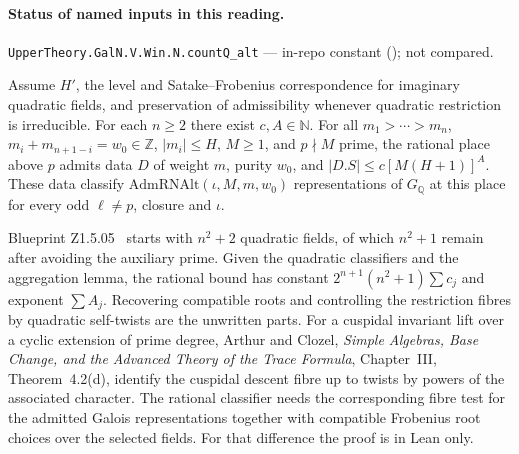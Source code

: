 

\paragraph{Status of named inputs in this reading.}
\noindent\nolinkurl{UpperTheory.GalN.V.Win.N.countQ_alt} --- in-repo constant (); not compared.\par

\begin{formalstatement}\label{pn:P030}
Assume \(H'\), the level and Satake--Frobenius correspondence for
imaginary quadratic fields, and preservation of admissibility whenever
quadratic restriction is irreducible. For each \(n\ge2\) there exist
\(c,A\in\mathbb N\). For all \(m_1>\cdots>m_n\),
\(m_i+m_{n+1-i}=w_0\in\mathbb Z\), \(|m_i|\le H\), \(M\ge1\),
and \(p\nmid M\) prime, the rational place above \(p\) admits data
\(D\) of weight \(m\), purity \(w_0\), and \(|D.S|\le c[M(H+1)]^A\).
These data classify \(\mathrm{AdmRNAlt}(\iota,M,m,w_0)\) representations
of \(G_{\mathbb Q}\) at this place for every odd \(\ell\ne p\), closure
and \(\iota\).
\end{formalstatement}

Blueprint Z1.5.05~ starts with \(n^2+2\) quadratic fields, of which
\(n^2+1\) remain after avoiding the auxiliary prime. Given the
quadratic classifiers and the aggregation lemma, the rational bound
has constant \(2^{n+1}(n^2+1)\sum c_j\) and exponent \(\sum A_j\).
Recovering compatible roots and controlling the restriction fibres by
quadratic self-twists are the unwritten parts. For a cuspidal invariant
lift over a cyclic extension of prime degree, Arthur and Clozel,
\emph{Simple Algebras, Base Change, and the Advanced Theory of the Trace
Formula}, Chapter~III, Theorem~4.2(d), identify the cuspidal descent
fibre up to twists by powers of the associated character. The rational
classifier needs the corresponding fibre test for the admitted Galois
representations together with compatible Frobenius root choices over
the selected fields. For that difference the proof is in Lean only.
\cite{r21-ac}

